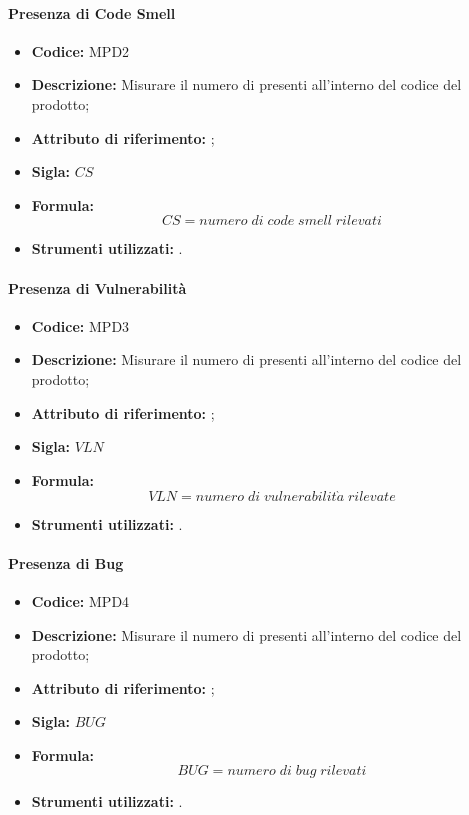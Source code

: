 \paragraph{Presenza di Code Smell} 
\begin{itemize}
    \item \textbf{Codice:} MPD2
    \item \textbf{Descrizione:} Misurare il numero di  presenti all'interno del codice del prodotto;
    \item \textbf{Attributo di riferimento:} ;
    \item \textbf{Sigla:} $CS$
    \item \textbf{Formula:} $$CS = {numero \; di \; code \; smell \; rilevati}$$
    \item \textbf{Strumenti utilizzati:} .
\end{itemize}

\paragraph{Presenza di Vulnerabilità} 
\begin{itemize}
    \item \textbf{Codice:} MPD3
    \item \textbf{Descrizione:} Misurare il numero di  presenti all'interno del codice del prodotto;
    \item \textbf{Attributo di riferimento:} ;
    \item \textbf{Sigla:} $VLN$
    \item \textbf{Formula:} $$VLN = {numero \; di \; vulnerabilit\grave{a} \; rilevate}$$
    \item \textbf{Strumenti utilizzati:} .
\end{itemize}

\paragraph{Presenza di Bug} 
\begin{itemize}
    \item \textbf{Codice:} MPD4
    \item \textbf{Descrizione:} Misurare il numero di  presenti all'interno del codice del prodotto;
    \item \textbf{Attributo di riferimento:} ;
    \item \textbf{Sigla:} $BUG$
    \item \textbf{Formula:} $$BUG = {numero \; di \; bug \; rilevati}$$
    \item \textbf{Strumenti utilizzati:} .
\end{itemize}

